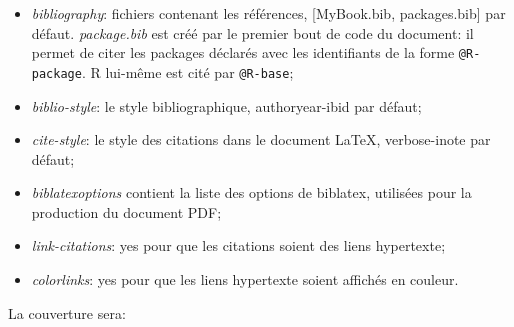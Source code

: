 \documentclass[
  11pt,
  french,
  a4paper,
  extrafontsizes,onecolumn,openright
  ]{memoir}
\begin{document}
\begin{itemize}
\item
  \emph{bibliography}: fichiers contenant les références, {[}MyBook.bib, packages.bib{]} par défaut. \emph{package.bib} est créé par le premier bout de code du document: il permet de citer les packages déclarés avec les identifiants de la forme \texttt{@R-package}. R lui-même est cité par \texttt{@R-base};
\item
  \emph{biblio-style}: le style bibliographique, authoryear-ibid par défaut;
\item
  \emph{cite-style}: le style des citations dans le document LaTeX, verbose-inote par défaut;
\item
  \emph{biblatexoptions} contient la liste des options de biblatex, utilisées pour la production du document PDF;
\item
  \emph{link-citations}: yes pour que les citations soient des liens hypertexte;
\item
  \emph{colorlinks}: yes pour que les liens hypertexte soient affichés en couleur.
\end{itemize}

La couverture sera:
\end{document}
